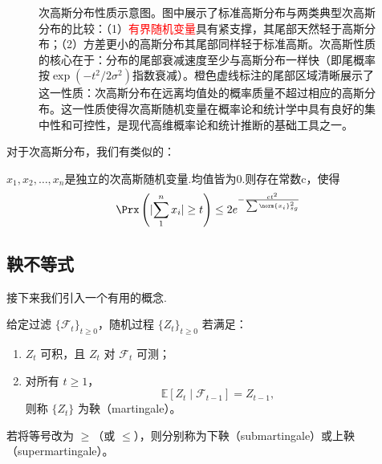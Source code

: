 \documentclass[lang=cn,newtx,10pt,scheme=chinese,chinesefont=nofont,citestyle=gb7714-2015, bibstyle=gb7714-2015]{elegantbook}
\providecommand{\abs}[1]{\lvert#1\rvert}
\begin{document}
\begin{refsection}
\begin{figure}[htbp]
\caption{次高斯分布性质示意图。图中展示了标准高斯分布与两类典型次高斯分布的比较：（1）\textcolor{red}{有界随机变量}具有紧支撑，其尾部天然轻于高斯分布；（2）\textcolor{green!60!black}{方差更小的高斯分布}其尾部同样轻于标准高斯。次高斯性质的核心在于：分布的尾部衰减速度至少与高斯分布一样快（即尾概率按$\exp(-t^2/2\sigma^2)$指数衰减）。橙色虚线标注的尾部区域清晰展示了这一性质：次高斯分布在远离均值处的概率质量不超过相应的高斯分布。这一性质使得次高斯随机变量在概率论和统计学中具有良好的集中性和可控性，是现代高维概率论和统计推断的基础工具之一。}
\label{fig:subgaussian}
\end{figure}

对于次高斯分布，我们有类似的：
\begin{theorem}[次高斯分布的Hoeffding界]
   $x_1, x_2, \dots, x_n$是独立的次高斯随机变量.均值皆为0.则存在常数c，使得
   \begin{equation*}
       \Prx\left(\abs{\sum_1^nx_i}\geq t\right)\leq2e^{-\frac{ct^2}{\sum\norm{x_i}_{sg}^2}}
   \end{equation*}
\end{theorem}

\subsection{鞅不等式}
接下来我们引入一个有用的概念.
\begin{definition}[鞅、下鞅、上鞅]
给定过滤 $\{\mathcal{F}_t\}_{t\ge 0}$，随机过程 $\{Z_t\}_{t\ge 0}$ 若满足：
\begin{enumerate}
  \item $Z_t$ 可积，且 $Z_t$ 对 $\mathcal{F}_t$ 可测；
  \item 对所有 $t\ge 1$，
  \[
    \mathbb{E}[Z_t\mid \mathcal{F}_{t-1}] = Z_{t-1},
  \]
  则称 $\{Z_t\}$ 为鞅（martingale）。
\end{enumerate}
若将等号改为 $\ge$（或 $\le$），则分别称为下鞅（submartingale）或上鞅（supermartingale）。
\end{definition}


\end{refsection}
\end{document}
